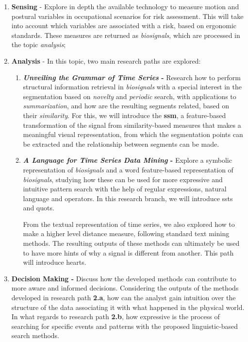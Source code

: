 \begin{enumerate}

\item \textbf{Sensing} - Explore in depth the available technology to measure motion and postural variables in occupational scenarios for risk assessment. This will take into account which variables are associated with a risk, based on ergonomic standards. These measures are returned as \textit{biosignals}, which are processed in the topic \textit{analysis};

\item \textbf{Analysis} - In this topic, two main research paths are explored: 
	\begin{enumerate}
		\item \textbf{\textit{Unveiling the Grammar of Time Series} -} Research how to perform structural information retrieval in \textit{biosignals} with a special interest in the segmentation based on \textit{novelty} and \textit{periodic} search, with applications to \textit{summarization}, and how are the resulting segments related, based on their \textit{similarity}. For this, we will introduce the \textbf{\gls{ssm}}, a feature-based transformation of the signal from similarity-based measures that makes a meaningful visual representation, from which the segmentation points can be extracted and the relationship between segments can be made. 
		\item \textbf{\textit{A Language for Time Series Data Mining} - } Explore a symbolic representation of \textit{biosignals} and a word feature-based representation of \textit{biosignals}, studying how these can be used for more expressive and intuitive pattern search with the help of regular expressions, natural language and operators. In this research branch, we will introduce \gls{ssts} and \gls{quots}. 
		
From the textual representation of time series, we also explored how to make a higher level distance measure, following standard text mining methods. The resulting outputs of these methods can ultimately be used to have more hints of why a signal is different from another. This path will introduce \gls{hearts}.

	\end{enumerate}

\item \textbf{Decision Making -} Discuss how the developed methods can contribute to more aware and informed decisions. Considering the outputs of the methods developed in research path \textbf{2.a}, how can the analyst gain intuition over the structure of the data associating it with what happened in the physical world. In what regards to research path \textbf{2.b}, how expressive is the process of searching for specific events and patterns with the proposed linguistic-based search methods.

\end{enumerate}

